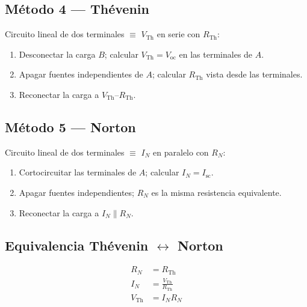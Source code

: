 \documentclass[11pt,a4paper]{article}
\begin{document}
\begin{center}
\end{center}

\subsection{Método 4 --- Thévenin}
Circuito lineal de dos terminales \(\equiv\) \(V_{\mathrm{Th}}\) en serie con \(R_{\mathrm{Th}}\):
\begin{enumerate}
  \item Desconectar la carga \(B\); calcular \(V_{\mathrm{Th}}=V_{\mathrm{oc}}\) en las terminales de \(A\).
  \item Apagar fuentes independientes de \(A\); calcular \(R_{\mathrm{Th}}\) vista desde las terminales.
  \item Reconectar la carga a \(V_{\mathrm{Th}}\)--\(R_{\mathrm{Th}}\).
\end{enumerate}

\subsection{Método 5 --- Norton}
Circuito lineal de dos terminales \(\equiv\) \(I_N\) en paralelo con \(R_N\):
\begin{enumerate}
  \item Cortocircuitar las terminales de \(A\); calcular \(I_N=I_{\mathrm{sc}}\).
  \item Apagar fuentes independientes; \(R_N\) es la misma resistencia equivalente.
  \item Reconectar la carga a \(I_N\|R_N\).
\end{enumerate}

\subsection{Equivalencia Thévenin \(\leftrightarrow\) Norton}
\begin{align}
R_N &= R_{\mathrm{Th}} \tag{2.26}\\
I_N &= \frac{V_{\mathrm{Th}}}{R_{\mathrm{Th}}} \tag{2.27}\\
V_{\mathrm{Th}} &= I_N R_N \tag{2.28}
\end{align}
\end{document}
